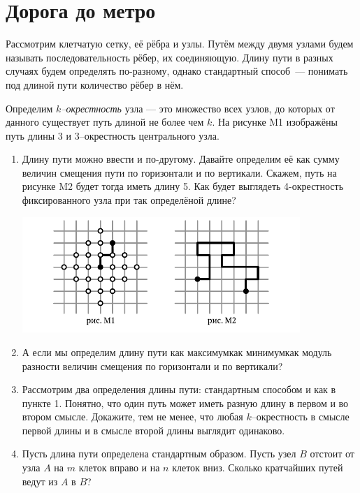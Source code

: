 \section{Дорога до метро}

\noindent Рассмотрим клетчатую сетку, её рёбра и узлы. Путём между двумя узлами будем называть последовательность рёбер, их соединяющую. Длину пути в разных случаях будем определять по-разному, однако стандартный способ~— понимать под длиной пути количество рёбер в нём.

\ms Определим {\it $k$--окрестность} узла — это множество всех узлов, до которых от данного существует путь длиной не более чем $k$. На рисунке M1 изображёны путь длины 3 и 3--окрестность центрального узла.

\begin{enumerate}

\item Длину пути можно ввести и по-другому. Давайте определим её как сумму величин смещения пути по горизонтали и по вертикали. Скажем, путь на рисунке M2 будет тогда иметь длину 5. Как будет выглядеть 4-окрестность фиксированного узла при так определёной длине?

\vspace{-0.3cm}
\begin{center}
\includegraphics[width=10.5cm]{images/metro1.pdf}
\end{center} \vspace{-0.7cm}

\item А если мы определим длину пути как максимум\scolon как минимум\scolon как модуль разности величин смещения по горизонтали и по вертикали?

\item Рассмотрим два определения длины пути: стандартным способом и как в пункте 1. Понятно, что один путь может иметь разную длину в первом и во втором смысле. Докажите, тем не менее, что любая $k$--окрестность в смысле первой длины и в смысле второй длины выглядит одинаково.

\item Пусть длина пути определена стандартным образом. Пусть узел $B$ отстоит от узла $A$ на $m$ клеток вправо и на $n$ клеток вниз. Сколько кратчайших путей ведут из $A$ в $B$?

\end{enumerate}

